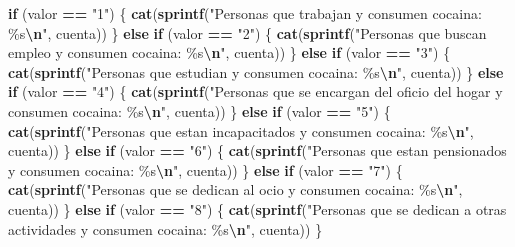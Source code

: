 \documentclass[
]{article}
\newenvironment{Shaded}{\begin{snugshade}}{\end{snugshade}}
\newcommand{\ControlFlowTok}[1]{\textcolor[rgb]{0.13,0.29,0.53}{\textbf{#1}}}
\newcommand{\FunctionTok}[1]{\textcolor[rgb]{0.13,0.29,0.53}{\textbf{#1}}}
\newcommand{\NormalTok}[1]{#1}
\newcommand{\SpecialCharTok}[1]{\textcolor[rgb]{0.81,0.36,0.00}{\textbf{#1}}}
\newcommand{\StringTok}[1]{\textcolor[rgb]{0.31,0.60,0.02}{#1}}
\begin{document}
\begin{Shaded}
\begin{Highlighting}[]
  \ControlFlowTok{if}\NormalTok{ (valor }\SpecialCharTok{==} \StringTok{"1"}\NormalTok{) \{}
    \FunctionTok{cat}\NormalTok{(}\FunctionTok{sprintf}\NormalTok{(}\StringTok{"Personas que trabajan y consumen cocaina: \%s}\SpecialCharTok{\textbackslash{}n}\StringTok{"}\NormalTok{, cuenta))}
\NormalTok{  \} }\ControlFlowTok{else} \ControlFlowTok{if}\NormalTok{ (valor }\SpecialCharTok{==} \StringTok{"2"}\NormalTok{) \{}
    \FunctionTok{cat}\NormalTok{(}\FunctionTok{sprintf}\NormalTok{(}\StringTok{"Personas que buscan empleo y consumen cocaina: \%s}\SpecialCharTok{\textbackslash{}n}\StringTok{"}\NormalTok{, cuenta))}
\NormalTok{  \} }\ControlFlowTok{else} \ControlFlowTok{if}\NormalTok{ (valor }\SpecialCharTok{==} \StringTok{"3"}\NormalTok{) \{}
    \FunctionTok{cat}\NormalTok{(}\FunctionTok{sprintf}\NormalTok{(}\StringTok{"Personas que estudian y consumen cocaina: \%s}\SpecialCharTok{\textbackslash{}n}\StringTok{"}\NormalTok{, cuenta))}
\NormalTok{  \} }\ControlFlowTok{else} \ControlFlowTok{if}\NormalTok{ (valor }\SpecialCharTok{==} \StringTok{"4"}\NormalTok{) \{}
    \FunctionTok{cat}\NormalTok{(}\FunctionTok{sprintf}\NormalTok{(}\StringTok{"Personas que se encargan del oficio del hogar y consumen cocaina: \%s}\SpecialCharTok{\textbackslash{}n}\StringTok{"}\NormalTok{, cuenta))}
\NormalTok{  \} }\ControlFlowTok{else} \ControlFlowTok{if}\NormalTok{ (valor }\SpecialCharTok{==} \StringTok{"5"}\NormalTok{) \{}
    \FunctionTok{cat}\NormalTok{(}\FunctionTok{sprintf}\NormalTok{(}\StringTok{"Personas que estan incapacitados y consumen cocaina: \%s}\SpecialCharTok{\textbackslash{}n}\StringTok{"}\NormalTok{, cuenta))}
\NormalTok{  \} }\ControlFlowTok{else} \ControlFlowTok{if}\NormalTok{ (valor }\SpecialCharTok{==} \StringTok{"6"}\NormalTok{) \{}
    \FunctionTok{cat}\NormalTok{(}\FunctionTok{sprintf}\NormalTok{(}\StringTok{"Personas que estan pensionados y consumen cocaina: \%s}\SpecialCharTok{\textbackslash{}n}\StringTok{"}\NormalTok{, cuenta))}
\NormalTok{  \} }\ControlFlowTok{else} \ControlFlowTok{if}\NormalTok{ (valor }\SpecialCharTok{==} \StringTok{"7"}\NormalTok{) \{}
    \FunctionTok{cat}\NormalTok{(}\FunctionTok{sprintf}\NormalTok{(}\StringTok{"Personas que se dedican al ocio y consumen cocaina: \%s}\SpecialCharTok{\textbackslash{}n}\StringTok{"}\NormalTok{, cuenta))}
\NormalTok{  \} }\ControlFlowTok{else} \ControlFlowTok{if}\NormalTok{ (valor }\SpecialCharTok{==} \StringTok{"8"}\NormalTok{) \{}
    \FunctionTok{cat}\NormalTok{(}\FunctionTok{sprintf}\NormalTok{(}\StringTok{"Personas que se dedican a otras actividades y consumen cocaina: \%s}\SpecialCharTok{\textbackslash{}n}\StringTok{"}\NormalTok{, cuenta))}
\NormalTok{  \}}
  

\end{Highlighting}
\end{Shaded}
\end{document}
